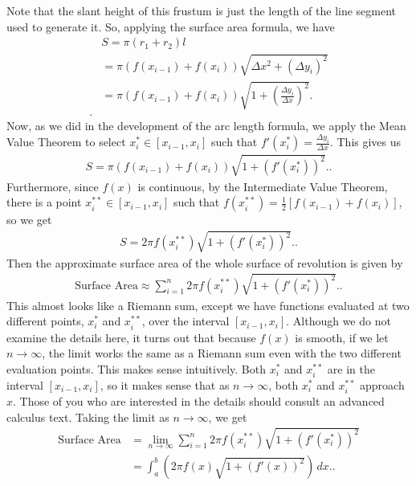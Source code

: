 \documentclass{report}
\begin{document}
    \pagebreak \bigbreak \noindent 
    Note that the slant height of this frustum is just the length of the line segment used to generate it. So, applying the surface area formula, we have
    \begin{align*}
        &S = \pi(r_1 + r_2)l  \\
        &= \pi\left(f(x_{i-1}) + f(x_i)\right)\sqrt{\Delta x^2 + (\Delta y_i)^2}  \\
        &= \pi\left(f(x_{i-1}) + f(x_i)\right)\sqrt{1 + \left(\frac{\Delta y_i}{\Delta x}\right)^2}. \\
    .\end{align*}
        Now, as we did in the development of the arc length formula, we apply the Mean Value Theorem to select \(x^*_i \in [x_{i-1}, x_i]\) such that \(f'(x^*_i) = \frac{\Delta y_i}{\Delta x}\). This gives us
        \begin{align*}
            S = \pi\left(f(x_{i-1}) + f(x_i)\right)\sqrt{1 + \left(f'(x^*_i)\right)^2}.
        .\end{align*}
        Furthermore, since \(f(x)\) is continuous, by the Intermediate Value Theorem, there is a point \(x^{**}_i \in [x_{i-1}, x_i]\) such that \(f(x^{**}_i) = \frac{1}{2}\left[f(x_{i-1}) + f(x_i)\right]\), so we get
        \begin{align*}
            S = 2\pi f(x^{**}_i)\sqrt{1 + \left(f'(x^*_i)\right)^2}.
        .\end{align*}
        Then the approximate surface area of the whole surface of revolution is given by
        \begin{align*}
            \text{Surface Area} \approx \sum_{i=1}^{n} 2\pi f(x^{**}_i)\sqrt{1 + \left(f'(x^*_i)\right)^2}.
        .\end{align*}
        This almost looks like a Riemann sum, except we have functions evaluated at two different points, \(x^*_i\) and \(x^{**}_i\), over the interval \([x_{i-1}, x_i]\). Although we do not examine the details here, it turns out that because \(f(x)\) is smooth, if we let \(n \to \infty\), the limit works the same as a Riemann sum even with the two different evaluation points. This makes sense intuitively. Both \(x^*_i\) and \(x^{**}_i\) are in the interval \([x_{i-1}, x_i]\), so it makes sense that as \(n \to \infty\), both \(x^*_i\) and \(x^{**}_i\) approach \(x\). Those of you who are interested in the details should consult an advanced calculus text.
        \bigbreak \noindent 
        Taking the limit as \(n \to \infty\), we get
        \begin{align*}
            \text{Surface Area} &= \lim_{{n \to \infty}} \sum_{i=1}^{n} 2\pi f(x^{**}_i)\sqrt{1 + \left(f'(x^*_i)\right)^2}  \\
            &= \int_{a}^{b} \left(2\pi f(x)\sqrt{1 + \left(f'(x)\right)^2}\right) \, dx.
        .\end{align*}
\end{document}
